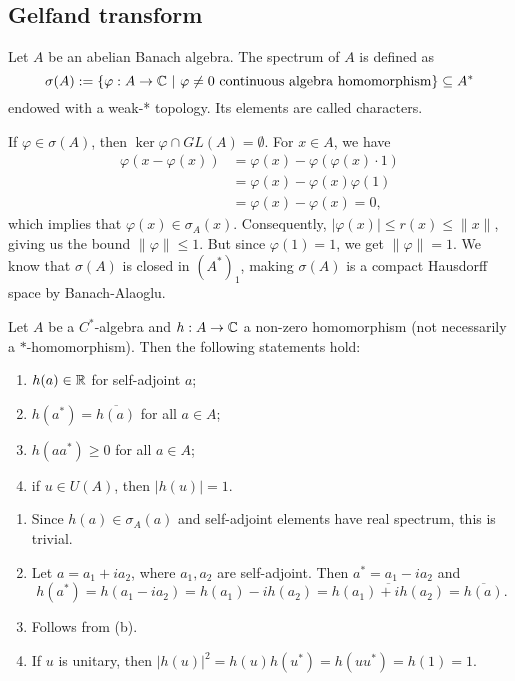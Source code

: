 \subsection{Gelfand transform}

\begin{definition}
  Let $A$ be an abelian Banach algebra. The spectrum of $A$ is defined as
  $$\sigma (A) := \{\varphi: A \to \mathbb {C}\ |\ \textrm{$\varphi \neq 0$ continuous algebra homomorphism}\} \subseteq A^*$$
  endowed with a weak-* topology. Its elements are called characters.
\end{definition}

If $\varphi \in \sigma (A)$, then $\ker \varphi \cap GL(A) = \emptyset.$
For $x \in A$, we have 
\begin{align*}
  \varphi(x - \varphi(x)) &= \varphi(x) - \varphi(\varphi(x) \cdot 1)\\
  &= \varphi(x) - \varphi(x) \varphi(1)\\
  &= \varphi(x) - \varphi(x) = 0,
\end{align*}
which implies that $\varphi(x) \in \sigma_A(x)$.
Consequently, $|\varphi(x)| \leq r(x)\leq \|x\|$, giving us the bound $\|\varphi\| \leq 1$.
But since $\varphi(1) = 1$, we get $\|\varphi\| = 1$.
We know that $\sigma (A)$ is closed in $(A^*)_1$, making $\sigma(A)$ is a compact Hausdorff space by Banach-Alaoglu.

\begin{proposition}
  Let $A$ be a $C^*$-algebra and $h: A \to \mathbb {C}$ a non-zero homomorphism (not necessarily a $*$-homomorphism). 
  Then the following statements hold:
  \begin{enumerate}
    \item $h(a) \in \mathbb {R}$ for self-adjoint $a$;
    \item $h(a^*) = \overline{h(a)}$ for all $a \in A$;
    \item $h(a a^*) \geq 0$ for all $a \in A$;
    \item if $u \in U(A)$, then $|h(u)| = 1$. 
  \end{enumerate}
\end{proposition}

\begin{myproof}
  \begin{enumerate}
    \item Since $h(a) \in \sigma_A(a)$ and self-adjoint elements have real spectrum, this is trivial.
    \item Let $a = a_1 + i a_2$, where $a_1, a_2$ are self-adjoint. Then $a^* = a_1 - i a_2$ and 
    $$h(a^*) = h(a_1 - i a_2) = h(a_1) - i h(a_2) = \overline{h(a_1) + i h(a_2)} = \overline{h(a)}.$$
    \item Follows from (b).
    \item If $u$ is unitary, then $|h(u)|^2 = h(u) h(u^*) = h(u u^*) = h(1) = 1$. \qedhere
  \end{enumerate}
\end{myproof}

